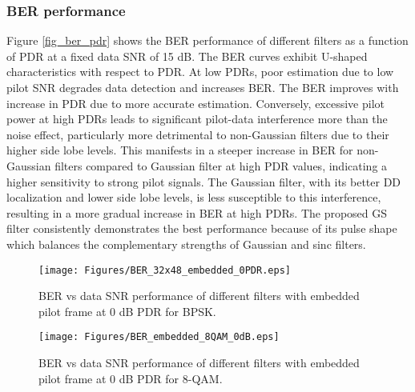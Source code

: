 \subsubsection{BER performance}
Figure \ref{fig_ber_pdr} shows the BER performance of different filters as a function of PDR at a fixed data SNR of 15 dB. 
The BER curves exhibit U-shaped characteristics with respect to PDR. At low PDRs, poor estimation due to low pilot SNR degrades data detection and increases BER.  The BER improves with increase in PDR due to more accurate estimation. Conversely, excessive pilot power at high PDRs leads to significant pilot-data interference more than the noise effect, particularly more detrimental to non-Gaussian filters due to their higher side lobe levels. This manifests in a steeper increase in BER for non-Gaussian filters compared to Gaussian filter at high PDR values, indicating a higher sensitivity to strong pilot signals. The Gaussian filter, with its better DD localization and lower side lobe levels, is less susceptible to this interference, resulting in a more gradual increase in BER at high PDRs. The proposed GS filter consistently demonstrates the best performance because of its pulse shape which balances the complementary strengths of Gaussian and sinc filters. 


\begin{figure}[!t]
\centering
\texttt{[image: Figures/BER\_32x48\_embedded\_0PDR.eps]}
\caption{BER vs data SNR performance of different filters with embedded pilot frame at 0 dB PDR for BPSK.}
\label{fig_ber}
\vspace{-5mm}
\end{figure}

\begin{figure}[!t]
\centering
\texttt{[image: Figures/BER\_embedded\_8QAM\_0dB.eps]}
\caption{BER vs data SNR performance of different filters with embedded pilot frame at 0 dB PDR for 8-QAM.}
\label{fig_ber_8qam}
\vspace{-5mm}
\end{figure}



